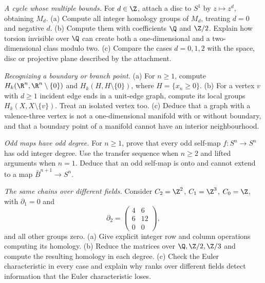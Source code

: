 \begin{exercise}[$\star\star$]\label{ex:v9-degree-attachment}
\emph{A cycle whose multiple bounds.} For $d\in\Z$, attach a disc to $S^1$ by $z\mapsto z^d$, obtaining $M_d$. (a) Compute all integer homology groups of $M_d$, treating $d=0$ and negative $d$. (b) Compute them with coefficients $\Q$ and $\Z/2$. Explain how torsion invisible over $\Q$ can create both a one-dimensional and a two-dimensional class modulo two. (c) Compare the cases $d=0,1,2$ with the space, disc or projective plane described by the attachment.
\end{exercise}

\begin{exercise}[$\star\star$]\label{ex:v9-local-homology}
\emph{Recognizing a boundary or branch point.} (a) For $n\ge1$, compute $H_k(\R^n,\R^n\setminus\{0\})$ and $H_k(H,H\setminus\{0\})$, where $H=\{x_n\ge0\}$. (b) For a vertex $v$ with $d\ge1$ incident edge ends in a unit-edge graph, compute its local groups $H_k(X,X\setminus\{v\})$. Treat an isolated vertex too. (c) Deduce that a graph with a valence-three vertex is not a one-dimensional manifold with or without boundary, and that a boundary point of a manifold cannot have an interior neighbourhood.
\end{exercise}

\begin{exercise}[$\star\star$]\label{ex:v9-odd-degree}
\emph{Odd maps have odd degree.} For $n\ge1$, prove that every odd self-map $f:S^n\to S^n$ has odd integer degree. Use the transfer sequence when $n\ge2$ and lifted arguments when $n=1$. Deduce that an odd self-map is onto and cannot extend to a map $\bar B^{n+1}\to S^n$.
\end{exercise}

\begin{exercise}[$\star\star$]\label{ex:v9-torsion-matrix}
\emph{The same chains over different fields.} Consider $C_2=\Z^2$, $C_1=\Z^3$, $C_0=\Z$, with $\partial_1=0$ and
\[
\partial_2=\begin{pmatrix}4&6\\6&12\\0&0\end{pmatrix},
\]
and all other groups zero. (a) Give explicit integer row and column operations computing its homology. (b) Reduce the matrices over $\Q,\Z/2,\Z/3$ and compute the resulting homology in each degree. (c) Check the Euler characteristic in every case and explain why ranks over different fields detect information that the Euler characteristic loses.
\end{exercise}


